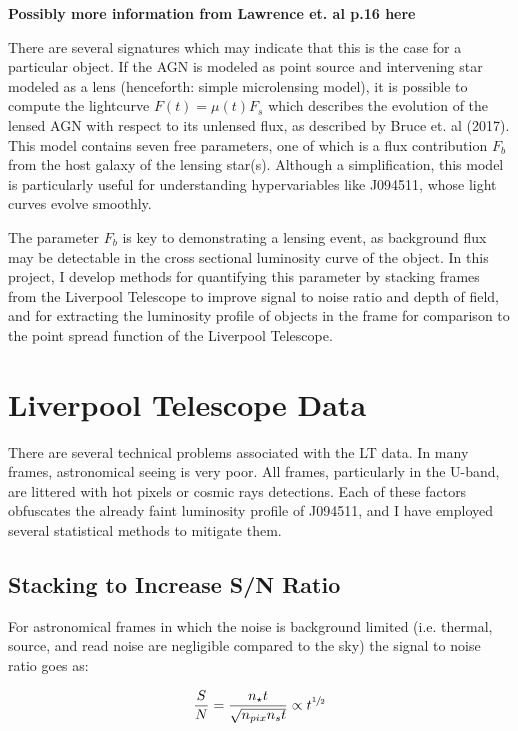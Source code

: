 \documentclass[a4paper,11pt]{article}
\begin{document}
\textbf{Possibly more information from Lawrence et. al p.16 here}

 There are several signatures which may indicate that this is the case for a particular object. If the AGN is modeled as point source and intervening star modeled as a lens (henceforth: simple microlensing model), it is possible to compute the lightcurve $F(t) = \mu(t)F_s$ which describes the evolution of the lensed AGN with respect to its unlensed flux, as described by Bruce et. al (2017). This model contains seven free parameters, one of which is a flux contribution $F_b$ from the host galaxy of the lensing star(s). Although a simplification, this model is particularly useful for understanding hypervariables like J094511, whose light curves evolve smoothly.\cite{bruce_2017}

 The parameter $F_b$ is key to demonstrating a lensing event, as background flux may be detectable in the cross sectional luminosity curve of the object. In this project, I develop methods for quantifying this parameter by stacking frames from the Liverpool Telescope to improve signal to noise ratio and depth of field, and for extracting the luminosity profile of objects in the frame for comparison to the point spread function of the Liverpool Telescope.

\section{Liverpool Telescope Data}

There are several technical problems associated with the LT data. In many frames, astronomical seeing is very poor. All frames, particularly in the U-band, are littered with hot pixels or cosmic rays detections. Each of these factors obfuscates the already faint luminosity profile of J094511, and I have employed several statistical methods to mitigate them.

\subsection{Stacking to Increase S/N Ratio}

For astronomical frames in which the noise is background limited (i.e. thermal, source, and read noise are negligible compared to the sky) the signal to noise ratio goes as\cite{lawrence_2014}\cite{mcclure_2019}:

\begin{equation}
    \frac{S}{N} = \frac{n_\star t}{\sqrt{n_{pix}n_st}} \propto t^{\sfrac{1}{2}}
\end{equation}
\end{document}
